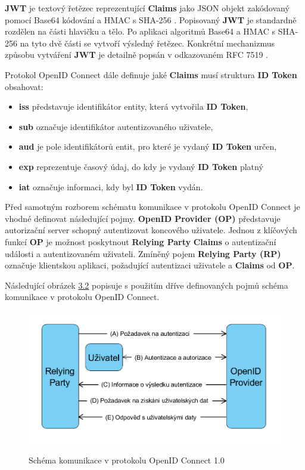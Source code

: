 \documentclass[
  printed, %
  twoside, %
  table,   %
  nolof,     %
  nolot,     %
]{fithesis3}
\begin{document}
\textbf{JWT} je textový řetězec reprezentující \textbf{Claims} jako JSON objekt \cite{rfc8259}  zakódovaný pomocí Base64 \cite{rfc4648} kódování a HMAC s SHA-256 \cite{rfc4868}. Popisovaný \textbf{JWT} je standardně rozdělen na části hlavičku a tělo. Po aplikaci algoritmů Base64 a HMAC s SHA-256 na tyto dvě části se vytvoří výsledný řetězec. Konkrétní mechanizmus způsobu vytváření \textbf{JWT} je detailně popsán v odkazovaném RFC 7519 \cite{rfc7519}. \par

Protokol OpenID Connect dále definuje jaké \textbf{Claims} musí struktura \textbf{ID Token} obsahovat:

\begin{itemize}
    \item \textbf{iss} představuje identifikátor entity, která vytvořila \textbf{ID Token}, 
    \item \textbf{sub} označuje identifikátor autentizovaného uživatele, 
    \item \textbf{aud} je pole identifikátorů entit, pro které je vydaný \textbf{ID Token} určen,
    \item \textbf{exp} reprezentuje časový údaj, do kdy je vydaný \textbf{ID Token} platný
    \item \textbf{iat} označuje informaci, kdy byl \textbf{ID Token} vydán.
\end{itemize}
\par

Před samotným rozborem schématu komunikace v protokolu OpenID Connect je vhodné definovat následující pojmy. \textbf{OpenID Provider (OP)} představuje autorizační server schopný autentizovat koncového uživatele. Jednou z klíčových funkcí \textbf{OP} je možnost poskytnout \textbf{Relying Party} \textbf{Claims} o autentizační události a autentizovaném uživateli. Zmíněný pojem \textbf{Relying Party (RP)} označuje klientskou aplikaci, požadující autentizaci uživatele a \textbf{Claims} od \textbf{OP}. \par
Následující obrázek \hyperref[fig:oidc]{3.2} popisuje s použitím dříve definovaných pojmů schéma komunikace v protokolu OpenID Connect.

\begin{figure}[H]
\caption{Schéma komunikace v protokolu OpenID Connect 1.0}
\centering
\includegraphics[width=12.8cm]{pics/diplomkaOIDC} 
\label{fig:oidc}
\end{figure}
\par 
\end{document}
